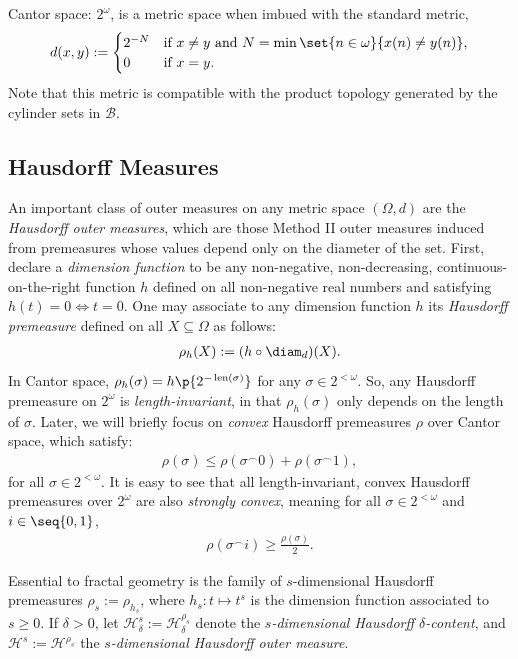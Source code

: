 Cantor space: $2^\omega$, is a metric space when imbued with the standard metric,
\begin{align*}
    d(x, y) := \begin{cases}
        2^{-N} & \text{if $x \neq y$ and $N = \min\set{n \in \omega}{x(n) \neq y(n)}$},\\
        0 & \text{if $x = y$}.
    \end{cases}
\end{align*}
Note that this metric is compatible with the product topology generated by the cylinder sets in $\mathcal{B}$. 

\subsection{Hausdorff Measures}

An important class of outer measures on any metric space $(\Omega, d)$ are the \textit{Hausdorff outer measures}, which are those Method II outer measures induced from premeasures whose values depend only on the diameter of the set. First, declare a \textit{dimension function} to be any non-negative, non-decreasing, continuous-on-the-right function $h$ defined on all non-negative real numbers and satisfying $h(t) = 0 \iff t = 0$. One may associate to any dimension function $h$ its \textit{Hausdorff premeasure} defined on all $X \subseteq \Omega$ as follows:
\begin{align*}
    \rho_h(X) := (h \circ \diam_d)(X).
\end{align*}
In Cantor space, $\rho_h(\sigma) = h\p{2^{- \operatorname{len}(\sigma)}}$ for any $\sigma \in 2^{<\omega}$. So, any Hausdorff premeasure on $2^\omega$ is \textit{length-invariant}, in that $\rho_h(\sigma)$ only depends on the length of $\sigma$. Later, we will briefly focus on \textit{convex} Hausdorff premeasures $\rho$ over Cantor space, which satisfy:
\begin{align*}
    \rho(\sigma) \leq \rho(\sigma^\smallfrown 0) + \rho(\sigma^\smallfrown 1),
\end{align*}
for all $\sigma \in 2^{<\omega}$. It is easy to see that all length-invariant, convex Hausdorff premeasures over $2^\omega$ are also \textit{strongly convex}, meaning for all $\sigma \in 2^{<\omega}$ and $i \in \seq{0, 1}$, 
\begin{align*}
    \rho(\sigma ^\smallfrown i) \geq \frac{\rho(\sigma)}{2}.
\end{align*}

Essential to fractal geometry is the family of $s$-dimensional Hausdorff premeasures $\rho_s := \rho_{h_s}$, where $h_s : t \mapsto t^s$ is the dimension function associated to $s \geq 0$. If $\delta > 0$, let $\mathcal{H}^s_{\delta} := \mathcal{H}^{\rho_s}_\delta$ denote the \textit{$s$-dimensional Hausdorff $\delta$-content}, and $\mathcal{H}^s := \mathcal{H}^{\rho_s}$ the \textit{$s$-dimensional Hausdorff outer measure}. 

